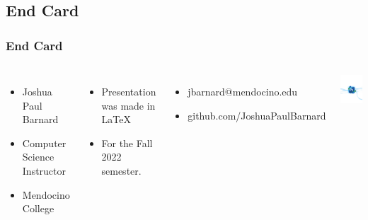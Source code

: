 \documentclass{beamer}
\begin{document}
		\subsection{End Card}
		\begin{frame}
			\frametitle{End Card}	
			\begin{columns}
				\vspace{-25pt}
				\begin{itemize}
					\item Joshua Paul Barnard
					\item Computer Science Instructor
					\item Mendocino College
				\end{itemize}
			\space
				\begin{itemize}
					\item Presentation was made in \LaTeX
					\item For the Fall 2022 semester.  
				\end{itemize}
				\begin{itemize}
					\item jbarnard@mendocino.edu
					\item github.com/JoshuaPaulBarnard
				\end{itemize}
				\includegraphics[width=.85\textwidth]{images/photoshop_logo_by_andreopoulosa.jpg}
			\end{columns}
		\end{frame}
	
\end{document}
